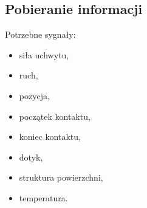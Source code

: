 \documentclass[8pt]{beamer}
\begin{document}
	\subsection{Pobieranie informacji}
		\begin{frame}
		Potrzebne sygnały:
			\begin{itemize}[<+->]
				\item siła uchwytu,
				\item ruch,
				\item pozycja,
				\item początek kontaktu,
				\item koniec kontaktu,
				\item dotyk, 
				\item struktura powierzchni,
				\item temperatura.
			\end{itemize}
		\end{frame}		
		
		
		
\end{document}
